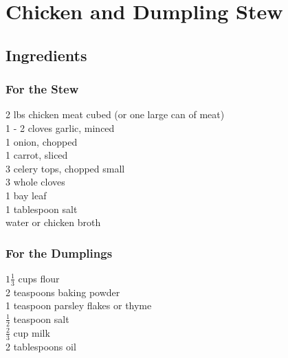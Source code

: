 \documentclass{article}
\begin{document}
\section*{Chicken and Dumpling Stew}



\subsection*{Ingredients}
\subsubsection*{For the Stew}

2 lbs chicken meat cubed (or one large can of meat)\\
1 - 2 cloves garlic, minced\\
1 onion, chopped\\
1 carrot, sliced\\
3 celery tops, chopped small\\
3 whole cloves\\
1 bay leaf\\
1 tablespoon salt\\
water or chicken broth\\

\subsubsection*{For the Dumplings}
$1 \frac{1}{3}$ cups flour\\
2 teaspoons baking powder\\
1 teaspoon parsley flakes or thyme\\
$\frac{1}{2}$ teaspoon salt\\
$\frac{2}{3}$ cup milk\\
2 tablespoons oil\\
\end{document}
